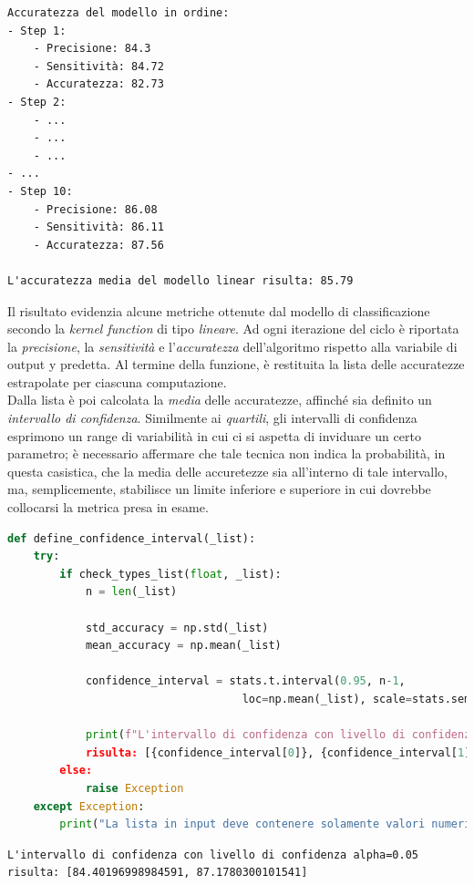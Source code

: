 \documentclass{article}
\begin{document}
    \begin{lstlisting}[style=Jupyter]
Accuratezza del modello in ordine:
- Step 1:
	- Precisione: 84.3
	- Sensitività: 84.72
	- Accuratezza: 82.73
- Step 2:
	- ...
	- ...
	- ...
- ...
- Step 10:
	- Precisione: 86.08
	- Sensitività: 86.11
	- Accuratezza: 87.56

L'accuratezza media del modello linear risulta: 85.79
    \end{lstlisting}
    Il risultato evidenzia alcune metriche ottenute dal modello di classificazione secondo la \textit{kernel function} di tipo \textit{lineare}. Ad ogni iterazione del ciclo è riportata la \textit{precisione}, la \textit{sensitività} e l'\textit{accuratezza} dell'algoritmo rispetto alla variabile di output y predetta. Al termine della funzione, è restituita la lista delle accuratezze estrapolate per ciascuna computazione. \vspace*{7pt}\\
    Dalla lista è poi calcolata la \textit{media} delle accuratezze, affinché sia definito un \textit{intervallo di confidenza}.
    Similmente ai \textit{quartili}, gli intervalli di confidenza esprimono un range di variabilità in cui ci si aspetta di inviduare un certo parametro; è necessario affermare che tale tecnica non indica la probabilità, in questa casistica, che la media delle accuretezze sia all'interno di tale intervallo, ma, semplicemente, stabilisce un limite inferiore e superiore in cui dovrebbe collocarsi la metrica presa in esame.
    \begin{lstlisting}[language=Python]
def define_confidence_interval(_list):
    try:
        if check_types_list(float, _list):
            n = len(_list)

            std_accuracy = np.std(_list)
            mean_accuracy = np.mean(_list)

            confidence_interval = stats.t.interval(0.95, n-1, 
                                    loc=np.mean(_list), scale=stats.sem(_list))

            print(f"L'intervallo di confidenza con livello di confidenza alpha=0.05
            risulta: [{confidence_interval[0]}, {confidence_interval[1]}]")
        else: 
            raise Exception
    except Exception:
        print("La lista in input deve contenere solamente valori numerici")
    \end{lstlisting}
    \begin{lstlisting}[style=Jupyter]
L'intervallo di confidenza con livello di confidenza alpha=0.05 risulta: [84.40196998984591, 87.1780300101541]
    \end{lstlisting}
\end{document}
